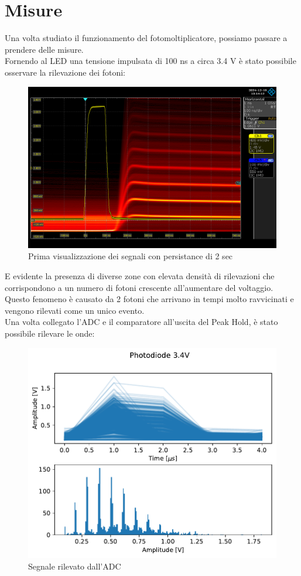 \pagebreak

\section{Misure}
Una volta studiato il funzionamento del fotomoltiplicatore, possiamo passare a prendere delle misure.\\

Fornendo al LED una tensione impulsata di 100 ns a circa 3.4 V è stato possibile osservare la rilevazione dei fotoni:

\begin{figure}[!h]
    \centering
    \includegraphics[width=0.5\linewidth]{Photomultiplier/assets/SiPm/SiPm.png}
    \caption{Prima visualizzazione dei segnali con persistance di 2 sec}
\end{figure}

E evidente la presenza di diverse zone con elevata densità di rilevazioni che corrispondono a un numero di fotoni crescente all'aumentare del voltaggio. Questo fenomeno è causato da 2 fotoni che arrivano in tempi molto ravvicinati e vengono rilevati come un unico evento.\\
Una volta collegato l'ADC e il comparatore all'uscita del Peak Hold, è stato possibile rilevare le onde:

\begin{figure}[!h]
    \centering
    \includegraphics[width=0.5\linewidth]{Photomultiplier/assets/phot_3.4V.pdf}
    \caption{Segnale rilevato dall'ADC}
\end{figure}

